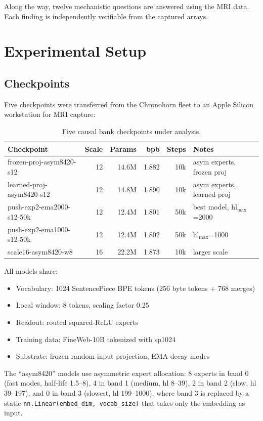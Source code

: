 \documentclass[11pt,a4paper]{report}
\begin{document}
Along the way, twelve mechanistic questions are answered using the MRI data. Each finding is independently verifiable from the captured arrays.


\chapter{Experimental Setup}

\section{Checkpoints}

Five checkpoints were transferred from the Chronohorn fleet to an Apple Silicon workstation for MRI capture:

\begin{table}[h]
\centering
\begin{tabular}{lrrrrl}
\toprule
\textbf{Checkpoint} & \textbf{Scale} & \textbf{Params} & \textbf{bpb} & \textbf{Steps} & \textbf{Notes} \\
\midrule
frozen-proj-asym8420-s12 & 12 & 14.6M & 1.882 & 10k & asym experts, frozen proj \\
learned-proj-asym8420-s12 & 12 & 14.8M & 1.890 & 10k & asym experts, learned proj \\
push-exp2-ema2000-s12-50k & 12 & 12.4M & 1.801 & 50k & best model, hl$_{\max}$=2000 \\
push-exp2-ema1000-s12-50k & 12 & 12.4M & 1.802 & 50k & hl$_{\max}$=1000 \\
scale16-asym8420-w8 & 16 & 22.2M & 1.873 & 10k & larger scale \\
\bottomrule
\end{tabular}
\caption{Five causal bank checkpoints under analysis.}
\label{tab:checkpoints}
\end{table}

All models share:
\begin{itemize}[nosep]
\item Vocabulary: 1024 SentencePiece BPE tokens (256 byte tokens + 768 merges)
\item Local window: 8 tokens, scaling factor 0.25
\item Readout: routed squared-ReLU experts
\item Training data: FineWeb-10B tokenized with sp1024
\item Substrate: frozen random input projection, EMA decay modes
\end{itemize}

The ``asym8420'' models use asymmetric expert allocation: 8 experts in band 0 (fast modes, half-life 1.5--8), 4 in band 1 (medium, hl 8--39), 2 in band 2 (slow, hl 39--197), and 0 in band 3 (slowest, hl 199--1000), where band 3 is replaced by a static \texttt{nn.Linear(embed\_dim, vocab\_size)} that takes only the embedding as input.
\end{document}
